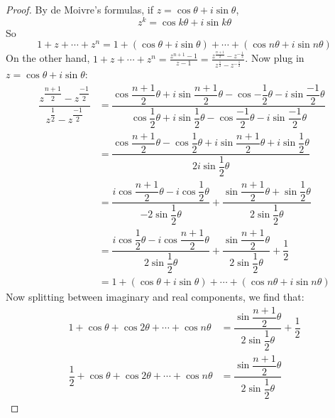 \documentclass{article}
\begin{document}
    \begin{proof}
        By de Moivre's formulas, if $z = \cos{\theta} + i\sin{\theta}$,
            \begin{equation*}
                z^{k} = \cos{k\theta} + i\sin{k\theta}
            \end{equation*}
        So
            \begin{equation*}
                1 + z + \cdots + z^{n} = 1 + (\cos{\theta} + i\sin{\theta}) + \cdots + (\cos{n\theta} + i\sin{n\theta})
            \end{equation*}
        On the other hand, $1 + z + \cdots + z^{n} = \frac{z^{n + 1} - 1}{z - 1} = \frac{z^{\frac{n + 1}{2}} - z^{-\frac{1}{2}}}{z^{\frac{1}{2}} - z^{-\frac{1}{2}}}$. Now plug in $z = \cos{\theta} + i \sin{\theta}$:
            \begin{align*}
                \dfrac{z^{\dfrac{n + 1}{2}} - z^{\dfrac{-1}{2}}}{z^{\dfrac{1}{2}} - z^{\dfrac{-1}{2}}} &= \dfrac{\cos{\dfrac{n + 1}{2}\theta + i\sin{\dfrac{n + 1}{2}\theta} - \cos{-\dfrac{1}{2}\theta} - i\sin{\dfrac{-1}{2}\theta}}}{\cos{\dfrac{1}{2}\theta} + i\sin{\dfrac{1}{2}\theta} - \cos{\dfrac{-1}{2}\theta} - i\sin{\dfrac{-1}{2}\theta}} \\
             &= \dfrac{\cos{\dfrac{n + 1}{2}\theta} - \cos{\dfrac{1}{2}\theta} + i \sin{\dfrac{n + 1}{2}\theta} + i \sin{\dfrac{1}{2}\theta}}{2i \sin{\dfrac{1}{2}\theta}} \\
                &= \dfrac{i \cos{\dfrac{n + 1}{2}\theta} - i \cos{\dfrac{1}{2}\theta}}{-2 \sin{\dfrac{1}{2}\theta}} + \dfrac{\sin{\dfrac{n + 1}{2}\theta} + \sin{\dfrac{1}{2}\theta}}{2 \sin{\dfrac{1}{2}\theta}} \\
                &= \dfrac{i \cos{\dfrac{1}{2}\theta} - i \cos{\dfrac{n + 1}{2}\theta}}{2 \sin{\dfrac{1}{2}\theta}} + \dfrac{\sin{\dfrac{n + 1}{2}\theta}}{2 \sin{\dfrac{1}{2}\theta}} + \dfrac{1}{2} \\
                &= 1 + (\cos{\theta} + i\sin{\theta}) + \cdots + (\cos{n\theta} + i\sin{n\theta})
            \end{align*}
        Now splitting between imaginary and real components, we find that:
            \begin{align*}
                1 + \cos{\theta} + \cos{2\theta} + \cdots + \cos{n\theta}            &= \dfrac{\sin{\dfrac{n + 1}{2}\theta}}{2 \sin{\dfrac{1}{2}\theta}} + \dfrac{1}{2} \\
                \dfrac{1}{2} + \cos{\theta} + \cos{2\theta} + \cdots + \cos{n\theta} &= \dfrac{\sin{\dfrac{n + 1}{2}\theta}}{2 \sin{\dfrac{1}{2}\theta}}                  

\end{align*}
\end{proof}
\end{document}
